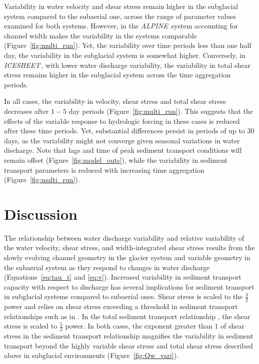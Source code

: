 \documentclass[11pt]{article}
\newcommand{\alpine}{\textit{ALPINE}\,}
\newcommand{\icesheet}{\textit{ICESHEET}\,}
\begin{document}
Variability in water velocity and shear stress remain higher in the subglacial system compared to the subaerial one, across the range of parameter values examined for both systems.
However, in the \alpine{} system accounting for channel width makes the variability in the systems comparable (Figure~\ref{fig:multi_run}).
Yet, the variability over time periods less than one half day, the variability in the subglacial system is somewhat higher. 
Conversely, in \icesheet{}, with lower water discharge variability, the variability in total shear stress remains higher in the subglacial system across the time aggregation periods.

In all cases, the variability in velocity, shear stress and total shear stress decreases after $1-5$ day periods (Figure~\ref{fig:multi_run}).
This suggests that the effects of the variable response to hydrologic forcing in these cases is reduced after these time periods.
Yet, substantial differences persist in periods of up to $30$ days, as the variability might not converge given seasonal variations in water discharge.
Note that lags and time of peak sediment transport conditions will remain offset (Figure~\ref{fig:model_outs}), while the variability in sediment transport parameters is reduced with increasing time aggregation (Figure~\ref{fig:multi_run}).





\section{Discussion}

The relationship between water discharge variability and relative variability of the water velocity, shear stress, and width-integrated shear stress results from the slowly evolving channel geometry in the glacier system and variable geometry in the subaerial system as they respond to changes in water discharge (Equations~\ref{eq:tau_t} and \ref{eq:v}).
Increased variability in sediment transport capacity with respect to discharge has several implications for sediment transport in subglacial systems compared to subaerial ones.
Shear stress is scaled to the $\frac{3}{2}$ power and relies on shear stress exceeding a threshold in sediment transport relationships  such as in \citet{meyer1948}.
In the total sediment transport relationship \citet{engelund1967}, the shear stress is scaled to $\frac{5}{2}$ power.
In both cases, the exponent greater than $1$ of shear stress in the sediment transport relationship magnifies the variability in sediment transport beyond the highly variable shear stress and total shear stress described above in subglacial environments (Figure~\ref{fig:Qw_vari}).
\end{document}
